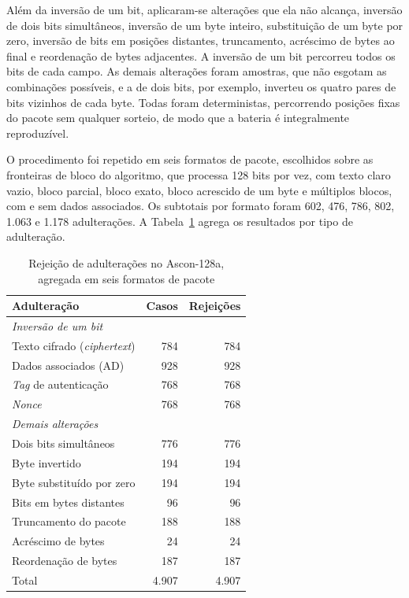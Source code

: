 Além da inversão de um bit, aplicaram-se alterações que ela não alcança, inversão de dois bits simultâneos, inversão de um byte inteiro, substituição de um byte por zero, inversão de bits em posições distantes, truncamento, acréscimo de bytes ao final e reordenação de bytes adjacentes. A inversão de um bit percorreu todos os bits de cada campo. As demais alterações foram amostras, que não esgotam as combinações possíveis, e a de dois bits, por exemplo, inverteu os quatro pares de bits vizinhos de cada byte. Todas foram deterministas, percorrendo posições fixas do pacote sem qualquer sorteio, de modo que a bateria é integralmente reproduzível.

O procedimento foi repetido em seis formatos de pacote, escolhidos sobre as fronteiras de bloco do algoritmo, que processa 128 bits por vez, com texto claro vazio, bloco parcial, bloco exato, bloco acrescido de um byte e múltiplos blocos, com e sem dados associados. Os subtotais por formato foram 602, 476, 786, 802, 1.063 e 1.178 adulterações. A Tabela~\ref{tab:aead_ascon128a} agrega os resultados por tipo de adulteração.

\begin{table}[htb]
\centering
\caption{Rejeição de adulterações no Ascon-128a, agregada em seis formatos de pacote}
\label{tab:aead_ascon128a}
\begin{tabular}{lrr}
\hline
\textbf{Adulteração} & \textbf{Casos} & \textbf{Rejeições} \\
\hline
\multicolumn{3}{l}{\textit{Inversão de um bit}} \\
\quad Texto cifrado (\textit{ciphertext}) & 784 & 784 \\
\quad Dados associados (AD)               & 928 & 928 \\
\quad \textit{Tag} de autenticação        & 768 & 768 \\
\quad \textit{Nonce}                      & 768 & 768 \\
\multicolumn{3}{l}{\textit{Demais alterações}} \\
\quad Dois bits simultâneos               & 776 & 776 \\
\quad Byte invertido                      & 194 & 194 \\
\quad Byte substituído por zero           & 194 & 194 \\
\quad Bits em bytes distantes             &  96 &  96 \\
\quad Truncamento do pacote               & 188 & 188 \\
\quad Acréscimo de bytes                  &  24 &  24 \\
\quad Reordenação de bytes                & 187 & 187 \\
\hline
Total                                     & 4.907 & 4.907 \\
\hline
\end{tabular}
\end{table}

